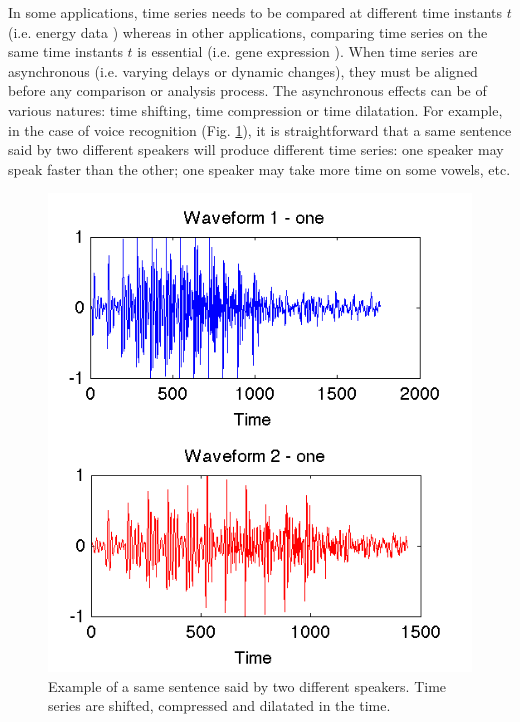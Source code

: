 In some applications, time series needs to be compared at different time instants $t$ (i.e. energy data \cite{Najmeddine2012}) whereas in other applications, comparing time series on the same time instants $t$ is essential (i.e. gene expression \cite{Chouakria2007}). When time series are asynchronous (i.e. varying delays or dynamic changes), they must be aligned before any comparison or analysis process. The asynchronous effects can be of various natures: time shifting, time compression or time dilatation. For example, in the case of voice recognition (Fig. \ref{fig:Voice_Example}), it is straightforward that a same sentence said by two different speakers will produce different time series: one speaker may speak faster than the other; one speaker may take more time on some vowels, etc.

\begin{figure}[h!]
\centering
\includegraphics[width=0.4\linewidth]{images/Voice_Example}
\caption{Example of a same sentence said by two different speakers. Time series are shifted, compressed and dilatated in the time.}
\label{fig:Voice_Example}
\end{figure}

